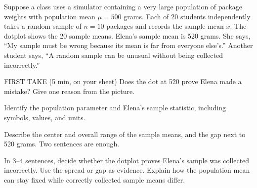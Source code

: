 \documentclass[14pt]{extarticle}
\begin{document}
\pagestyle{empty}


\noindent\begin{minipage}[t]{0.57\linewidth}
\vspace{0pt}
Suppose a class uses a simulator containing a very large population of package weights with population mean $\mu=500$ grams. Each of 20 students independently takes a random sample of $n=10$ packages and records the sample mean $\bar{x}$. The dotplot shows the 20 sample means. Elena's sample mean is 520 grams. She says, ``My sample must be wrong because its mean is far from everyone else's.'' Another student says, ``A random sample can be unusual without being collected incorrectly.''\par
\end{minipage}\hfill
\begin{minipage}[t]{0.40\linewidth}
\vspace{0pt}
\begin{center}
\end{center}
\end{minipage}

\begin{firsttakebox}{FIRST TAKE (5 min, on your sheet)}
Does the dot at 520 prove Elena made a mistake? Give one reason from the picture.
\end{firsttakebox}

\begin{description}[leftmargin=1.15in, labelwidth=1in, itemsep=2pt, topsep=2pt]
  \item[\dokbadge{1}~(a)] Identify the population parameter and Elena's sample statistic, including symbols, values, and units.
  \item[\dokbadge{2}~(b)] Describe the center and overall range of the sample means, and the gap next to 520 grams. Two sentences are enough.
  \item[\dokbadge{3}~(c)] In 3--4 sentences, decide whether the dotplot proves Elena's sample was collected incorrectly. Use the spread or gap as evidence. Explain how the population mean can stay fixed while correctly collected sample means differ.
\end{description}
\end{document}
